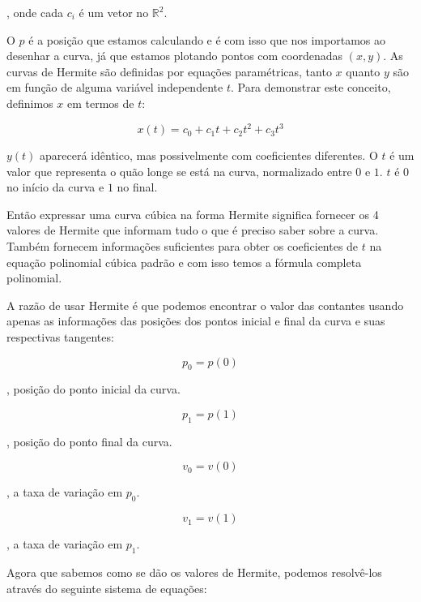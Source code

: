 , onde cada $c_i$ é um vetor no $\mathbb{R}^2$.

O $p$ é a posição que estamos calculando e é com isso que nos importamos ao desenhar a curva, já que estamos plotando pontos com coordenadas $(x,y)$. As curvas de Hermite são definidas por equações paramétricas, tanto $x$ quanto $y$ são em função de alguma variável independente $t$. Para demonstrar este conceito, definimos $x$ em termos de $t$:

\begin{equation}
    x(t) = c_0 + c_1t + c_2t^2 + c_3t^3
\end{equation}

$y(t)$ aparecerá idêntico, mas possivelmente com coeficientes diferentes. O $t$ é um valor que representa o quão longe se está na curva, normalizado entre $0$ e $1$. $t$ é $0$ no início da curva e $1$ no final.

Então expressar uma curva cúbica na forma Hermite significa fornecer os 4 valores de Hermite que informam tudo o que é preciso saber sobre a curva. Também fornecem informações suficientes para obter os coeficientes de $t$ na equação polinomial cúbica padrão e com isso temos a fórmula completa polinomial.

A razão de usar Hermite é que podemos encontrar o valor das contantes usando apenas as informações das posições dos pontos inicial e final da curva e suas respectivas tangentes:

\begin{equation}
    p_0 = p(0)
\end{equation}

, posição do ponto inicial da curva.

\begin{equation}
    p_1 = p(1)
\end{equation}

, posição do ponto final da curva.

\begin{equation}
    v_0 = v(0)
\end{equation}

, a taxa de variação em $p_0$.

\begin{equation}
    v_1 = v(1)
\end{equation}

, a taxa de variação em $p_1$.

Agora que sabemos como se dão os valores de Hermite, podemos resolvê-los através do seguinte sistema de equações:

